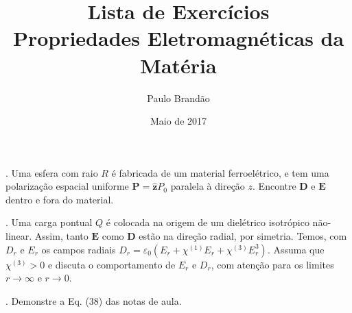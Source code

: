 \documentclass{article}
\title{\color{astral}\textbf{Lista de Exercícios} \\ \textbf{Propriedades Eletromagnéticas da Matéria}}
\author{Paulo Brandão}
\date{Maio de 2017}
\begin{document}
\maketitle

. Uma esfera com raio $R$ é fabricada de um material ferroelétrico, e tem uma polarização espacial uniforme $\mathbf{P} = \hat{\mathbf{z}}P_0$ paralela à direção $z$. Encontre $\mathbf{D}$ e $\mathbf{E}$ dentro e fora do material. 

\vspace{1cm}

. Uma carga pontual $Q$ é colocada na origem de um dielétrico isotrópico não-linear. Assim, tanto $\mathbf{E}$ como $\mathbf{D}$ estão na direção radial, por simetria. Temos, com $D_r$ e $E_r$ os campos radiais $D_r = \varepsilon_0( E_r + \chi^{(1)}E_r + \chi^{(3)}E_r^3 )$. Assuma que $\chi^{(3)}>0$ e discuta o comportamento de $E_r$ e $D_r$, com atenção para os limites $r\rightarrow \infty$ e $r\rightarrow 0$.

\vspace{1cm}

. Demonstre a Eq. (38) das notas de aula.
\end{document}
